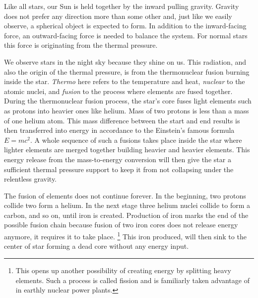 Like all stars, our Sun is held together by the inward pulling gravity.
Gravity does not prefer any direction more than some other and, just like we easily observe, a spherical object is expected to form.
In addition to the inward-facing force, an outward-facing force is needed to balance the system.
For normal stars this force is originating from the thermal pressure.

We observe stars in the night sky because they shine on us.%
This radiation, and also the origin of the thermal pressure, is from the thermonuclear fusion burning inside the star.
\textit{Thermo} here refers to the temperature and heat, \textit{nuclear} to the atomic nuclei, and \textit{fusion} to the process where elements are fused together.
During the thermonuclear fusion process, the star's core fuses light elements such as protons into heavier ones like helium.
Mass of two protons is less than a mass of one helium atom.
This mass difference between the start and end results is then transferred into energy in accordance to the Einstein's famous formula $E = mc^2$.
A whole sequence of such a fusions takes place inside the star where lighter elements are merged together building heavier and heavier elements.
This energy release from the mass-to-energy conversion will then give the star a sufficient thermal pressure support to keep it from not collapsing under the relentless gravity.

The fusion of elements does not continue forever.
In the beginning, two protons collide two form a helium.
In the next stage three helium nuclei collide to form a carbon, and so on, until iron is created.
Production of iron marks the end of the possible fusion chain because fusion of two iron cores does not release energy anymore, it requires it to take place.%
\footnote{This opens up another possibility of creating energy by splitting heavy elements. Such a process is called fission and is familiarly taken advantage of in earthly nuclear power plants.}
This iron produced, will then sink to the center of star forming a dead core without any energy input.

